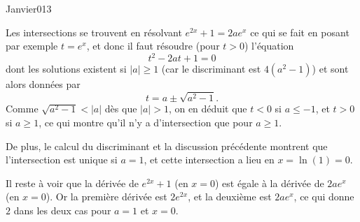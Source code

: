 \begin{corrige}{Janvier013}



Les intersections se trouvent en résolvant $e^{2x} + 1 = 2 a e^x$ ce
qui se fait en posant par exemple $t = e^x$, et donc il faut résoudre
(pour $t > 0$) l'équation
\begin{equation*}
  t^2  - 2 a t + 1 = 0
\end{equation*}
dont les solutions existent si $| a |\geq 1$ (car le discriminant
est $4(a^2 -1)$) et sont alors données par
\begin{equation*}
  t = a \pm \sqrt{a^2-1}.
\end{equation*}
Comme $\sqrt{a^2 - 1} <  |a|$ dès que $|a| > 1$, on en déduit
que $t < 0$ si $a \leq -1$, et $t > 0$ si $a \geq 1$, ce qui montre
qu'il n'y a d'intersection que pour $a \geq 1$.

De plus, le calcul du discriminant et la discussion précédente
montrent que l'intersection est unique si $a = 1$, et cette
intersection a lieu en $x = \ln(1) = 0$.

Il reste à voir que la dérivée de $e^{2x} + 1$ (en $x = 0$) est égale
à la dérivée de $2 a e^x$ (en $x = 0$). Or la première dérivée est $2
e^{2x}$, et la deuxième est $2 a e^x$, ce qui donne $2$ dans les deux
cas pour $a = 1$ et $x = 0$.


\end{corrige}
